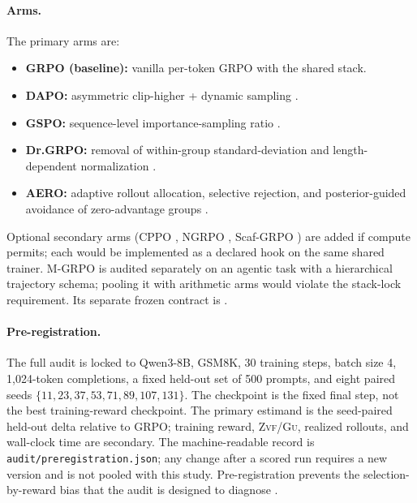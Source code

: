 \documentclass[11pt]{article}
\newcommand{\zvf}{\textsc{Zvf}}
\newcommand{\gu}{\textsc{Gu}}
\newcommand{\grpo}{\textsc{GRPO}}
\begin{document}
\paragraph{Arms.} The primary arms are:
\begin{itemize}[leftmargin=1.4em, itemsep=2pt]
  \item \textbf{GRPO (baseline):} vanilla per-token GRPO with the shared stack.
  \item \textbf{DAPO:} asymmetric clip-higher + dynamic sampling
    \cite{yu2025dapo}.
  \item \textbf{GSPO:} sequence-level importance-sampling ratio
    \cite{qwen2025gspo}.
  \item \textbf{Dr.\grpo{}:} removal of within-group standard-deviation and
    length-dependent normalization
    \cite{tong2025drgrpo}.
  \item \textbf{AERO:} adaptive rollout allocation, selective rejection, and
    posterior-guided avoidance of zero-advantage groups \cite{zhang2026aero}.
\end{itemize}
Optional secondary arms (CPPO \cite{lin2025cppo}, NGRPO
\cite{nan2025ngrpo}, Scaf-\grpo{} \cite{zhang2025scaffgrpo}) are added if compute
permits; each would be implemented as a declared hook on the same shared trainer.
M-\grpo{} \cite{hong2025mgrpo} is audited separately on an agentic task with a
hierarchical trajectory schema; pooling it with arithmetic arms would violate
the stack-lock requirement. Its separate frozen contract is
.

\paragraph{Pre-registration.} The full audit is locked to Qwen3-8B, GSM8K,
30 training steps, batch size 4, 1,024-token completions, a fixed held-out set
of 500 prompts, and eight paired seeds
$\{11,23,37,53,71,89,107,131\}$. The checkpoint is the fixed final step, not
the best training-reward checkpoint. The primary estimand is the seed-paired
held-out delta relative to GRPO; training reward, \zvf/\gu{}, realized rollouts,
and wall-clock time are secondary. The machine-readable record is
\texttt{audit/preregistration.json}; any change after a scored run requires a
new version and is not pooled with this study. Pre-registration prevents the
selection-by-reward bias that the audit is designed to diagnose
\cite{zvfaudit2026}.
\end{document}

